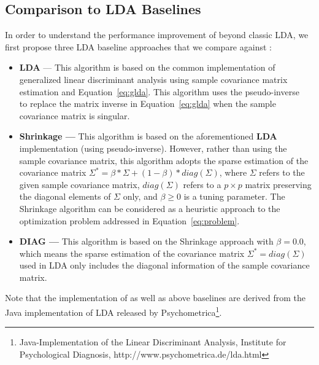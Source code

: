 


\subsection{Comparison to LDA Baselines}\label{sec:baselines}
In order to understand the performance improvement of \TheName{} beyond classic LDA, we first propose three LDA baseline approaches that we compare against \TheName{}:
\begin{itemize}
\item \textbf{LDA} --- This algorithm is based on the common implementation of generalized linear discriminant analysis using sample covariance matrix estimation and Equation~\ref{eq:glda}. This algorithm uses the pseudo-inverse~\cite{ye2004optimization} to replace the matrix inverse in Equation~\ref{eq:glda} when the sample covariance matrix is singular.

\item \textbf{Shrinkage --- } This algorithm is based on the aforementioned \textbf{LDA} implementation (using pseudo-inverse). However, rather than using the sample covariance matrix, this algorithm adopts the sparse estimation of the covariance matrix $\Sigma^*=\beta*\Sigma+(1-\beta) * diag(\Sigma)$, where $\Sigma$ refers to the given sample covariance matrix, $diag(\Sigma)$ refers to a $p\times p$ matrix preserving the diagonal elements of $\Sigma$ only, and $\beta\geq 0$ is a tuning parameter. 
    The Shrinkage algorithm can be considered as a heuristic approach to the optimization problem addressed in Equation~\ref{eq:problem}.

\item \textbf{DIAG --- } This algorithm is based on the Shrinkage approach with $\beta=0.0$, which means the sparse estimation of the covariance matrix $\Sigma^*=diag(\Sigma)$ used in LDA only includes the diagonal information of the sample covariance matrix.

\end{itemize}
Note that the implementation of \TheName{} as well as above baselines are derived from the Java implementation of LDA released by Psychometrica\footnote{Java-Implementation of the Linear Discriminant Analysis, Institute for Psychological Diagnosis, http://www.psychometrica.de/lda.html}.

